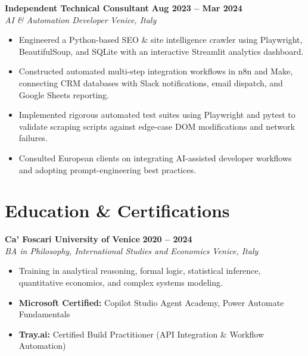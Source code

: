 \documentclass[10pt,a4paper]{article}
\newcommand{\role}[4]{%
  \textbf{#1} \hfill \textbf{#2}\\[1pt]%
  \textit{#3} \hfill \textit{#4}\\[2pt]%
}
\begin{document}
\role{Independent Technical Consultant}{Aug 2023 -- Mar 2024}{AI \& Automation Developer}{Venice, Italy}
\begin{itemize}
  \item Engineered a Python-based SEO \& site intelligence crawler using Playwright, BeautifulSoup, and SQLite with an interactive Streamlit analytics dashboard.
  \item Constructed automated multi-step integration workflows in n8n and Make, connecting CRM databases with Slack notifications, email dispatch, and Google Sheets reporting.
  \item Implemented rigorous automated test suites using Playwright and pytest to validate scraping scripts against edge-case DOM modifications and network failures.
  \item Consulted European clients on integrating AI-assisted developer workflows and adopting prompt-engineering best practices.
\end{itemize}

\section{Education \& Certifications}
\role{Ca' Foscari University of Venice}{2020 -- 2024}{BA in Philosophy, International Studies and Economics}{Venice, Italy}
\begin{itemize}
  \item Training in analytical reasoning, formal logic, statistical inference, quantitative economics, and complex systems modeling.
  \item \textbf{Microsoft Certified:} Copilot Studio Agent Academy, Power Automate Fundamentals
  \item \textbf{Tray.ai:} Certified Build Practitioner (API Integration \& Workflow Automation)
\end{itemize}
\end{document}
